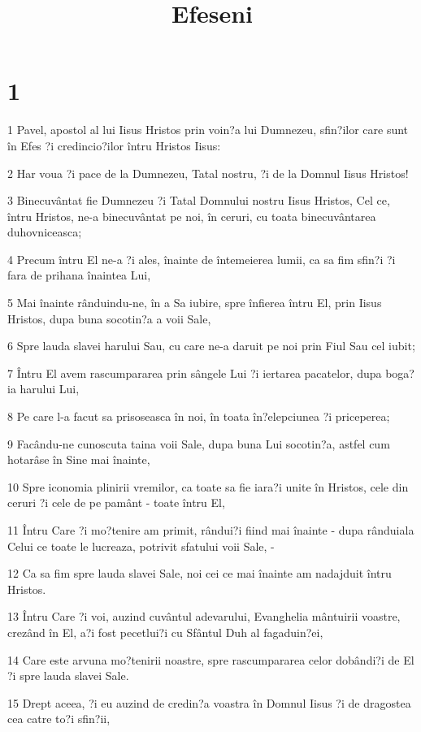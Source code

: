

\title{Efeseni}


\chapter{1}

\par 1 Pavel, apostol al lui Iisus Hristos prin voin?a lui Dumnezeu, sfin?ilor care sunt în Efes ?i credincio?ilor întru Hristos Iisus:
\par 2 Har voua ?i pace de la Dumnezeu, Tatal nostru, ?i de la Domnul Iisus Hristos!
\par 3 Binecuvântat fie Dumnezeu ?i Tatal Domnului nostru Iisus Hristos, Cel ce, întru Hristos, ne-a binecuvântat pe noi, în ceruri, cu toata binecuvântarea duhovniceasca;
\par 4 Precum întru El ne-a ?i ales, înainte de întemeierea lumii, ca sa fim sfin?i ?i fara de prihana înaintea Lui,
\par 5 Mai înainte rânduindu-ne, în a Sa iubire, spre înfierea întru El, prin Iisus Hristos, dupa buna socotin?a a voii Sale,
\par 6 Spre lauda slavei harului Sau, cu care ne-a daruit pe noi prin Fiul Sau cel iubit;
\par 7 Întru El avem rascumpararea prin sângele Lui ?i iertarea pacatelor, dupa boga?ia harului Lui,
\par 8 Pe care l-a facut sa prisoseasca în noi, în toata în?elepciunea ?i priceperea;
\par 9 Facându-ne cunoscuta taina voii Sale, dupa buna Lui socotin?a, astfel cum hotarâse în Sine mai înainte,
\par 10 Spre iconomia plinirii vremilor, ca toate sa fie iara?i unite în Hristos, cele din ceruri ?i cele de pe pamânt - toate întru El,
\par 11 Întru Care ?i mo?tenire am primit, rândui?i fiind mai înainte - dupa rânduiala Celui ce toate le lucreaza, potrivit sfatului voii Sale, -
\par 12 Ca sa fim spre lauda slavei Sale, noi cei ce mai înainte am nadajduit întru Hristos.
\par 13 Întru Care ?i voi, auzind cuvântul adevarului, Evanghelia mântuirii voastre, crezând în El, a?i fost pecetlui?i cu Sfântul Duh al fagaduin?ei,
\par 14 Care este arvuna mo?tenirii noastre, spre rascumpararea celor dobândi?i de El ?i spre lauda slavei Sale.
\par 15 Drept aceea, ?i eu auzind de credin?a voastra în Domnul Iisus ?i de dragostea cea catre to?i sfin?ii,
